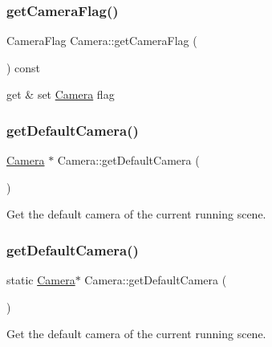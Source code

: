 \subsubsection{\texorpdfstring{get\+Camera\+Flag()}{getCameraFlag()}\hspace{0.1cm}{\footnotesize\ttfamily [2/2]}}
{\footnotesize\ttfamily Camera\+Flag Camera\+::get\+Camera\+Flag (\begin{DoxyParamCaption}{ }\end{DoxyParamCaption}) const\hspace{0.3cm}{\ttfamily [inline]}}

get \& set \hyperlink{classCamera}{Camera} flag \mbox{\label{classCamera_a09ad48ff40729017059d26b2e3363fd1}} 
\subsubsection{\texorpdfstring{get\+Default\+Camera()}{getDefaultCamera()}\hspace{0.1cm}{\footnotesize\ttfamily [1/2]}}
{\footnotesize\ttfamily \hyperlink{classCamera}{Camera} $\ast$ Camera\+::get\+Default\+Camera (\begin{DoxyParamCaption}{ }\end{DoxyParamCaption})\hspace{0.3cm}{\ttfamily [static]}}

Get the default camera of the current running scene. \mbox{\label{classCamera_abadd52964c1a4c82d76a297631d09926}} 
\subsubsection{\texorpdfstring{get\+Default\+Camera()}{getDefaultCamera()}\hspace{0.1cm}{\footnotesize\ttfamily [2/2]}}
{\footnotesize\ttfamily static \hyperlink{classCamera}{Camera}$\ast$ Camera\+::get\+Default\+Camera (\begin{DoxyParamCaption}{ }\end{DoxyParamCaption})\hspace{0.3cm}{\ttfamily [static]}}

Get the default camera of the current running scene. \mbox{\label{classCamera_afeacc2e59eb6cc6e32d55673f0c92ada}} 
